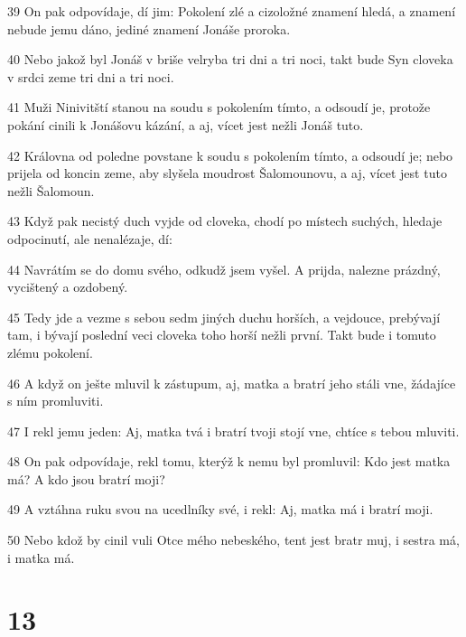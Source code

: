 \par 39 On pak odpovídaje, dí jim: Pokolení zlé a cizoložné znamení hledá, a znamení nebude jemu dáno, jediné znamení Jonáše proroka.
\par 40 Nebo jakož byl Jonáš v briše velryba tri dni a tri noci, takt bude Syn cloveka v srdci zeme tri dni a tri noci.
\par 41 Muži Ninivitští stanou na soudu s pokolením tímto, a odsoudí je, protože pokání cinili k Jonášovu kázání, a aj, vícet jest nežli Jonáš tuto.
\par 42 Královna od poledne povstane k soudu s pokolením tímto, a odsoudí je; nebo prijela od koncin zeme, aby slyšela moudrost Šalomounovu, a aj, vícet jest tuto nežli Šalomoun.
\par 43 Když pak necistý duch vyjde od cloveka, chodí po místech suchých, hledaje odpocinutí, ale nenalézaje, dí:
\par 44 Navrátím se do domu svého, odkudž jsem vyšel. A prijda, nalezne prázdný, vycištený a ozdobený.
\par 45 Tedy jde a vezme s sebou sedm jiných duchu horších, a vejdouce, prebývají tam, i bývají poslední veci cloveka toho horší nežli první. Takt bude i tomuto zlému pokolení.
\par 46 A když on ješte mluvil k zástupum, aj, matka a bratrí jeho stáli vne, žádajíce s ním promluviti.
\par 47 I rekl jemu jeden: Aj, matka tvá i bratrí tvoji stojí vne, chtíce s tebou mluviti.
\par 48 On pak odpovídaje, rekl tomu, kterýž k nemu byl promluvil: Kdo jest matka má? A kdo jsou bratrí moji?
\par 49 A vztáhna ruku svou na ucedlníky své, i rekl: Aj, matka má i bratrí moji.
\par 50 Nebo kdož by cinil vuli Otce mého nebeského, tent jest bratr muj, i sestra má, i matka má.

\chapter{13}

